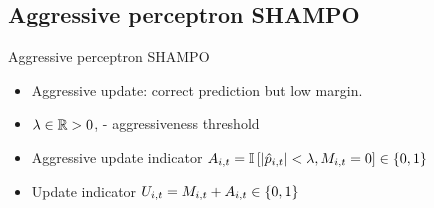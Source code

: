 \documentclass{beamer}
\begin{document}
\subsection{Aggressive perceptron SHAMPO}

\begin{frame}{Aggressive perceptron SHAMPO  }
\begin{itemize}
\item Aggressive update: correct prediction but low margin.\newline
\item $\lambda\in \mathbb{R}>0$, -  aggressiveness threshold\newline
\item Aggressive update indicator $A_{i,t}=\mathbb{I}\left[{\left\vert{\hat{p}_{i,t}}\right\vert<\lambda,M_{i,t}=0}\right]\in\left\{{0,1}\right\}$\newline
\item Update  indicator $U_{i,t}=M_{i,t}+A_{i,t}\in\left\{{0,1}\right\}$\newline
\end{itemize}
\end{frame}



%
%
\end{document}
